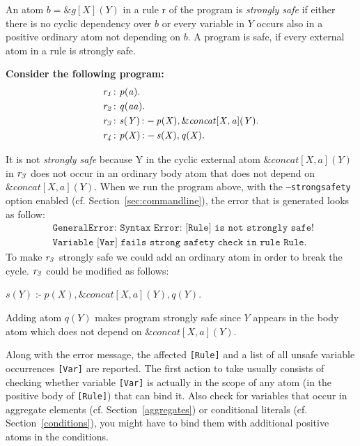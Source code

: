 \documentclass[a4paper, titlepage]{article}
\newcommand{\ext}[3]{\ensuremath{\&{#1}[#2](#3)}}
\DeclareMathOperator{\leftimpl}{:-}
\newcommand{\row}[1]{%
  \ensuremath{\it \color{black} #1 \color{black}}%
}
\begin{document}
An atom $b=\ext{g}{X}{Y}$ in a rule r of the program is \emph{strongly safe} if either there is no cyclic dependency over $b$   or every variable in $Y$ occurs also in a positive ordinary atom not depending on $b$. A program is safe, if every external atom in a rule is strongly safe. 


\begin{exmp} \textbf{Consider the following program:}
\label{strongSafetyExmp}
\begin{align*}
& \row{r_1} \colon p(a). \\
& \row{r_2} \colon q(aa). \\
& \row{r_3} \colon s(Y) \leftimpl p(X), \ext{concat}{X,a}{Y}. \\
& \row{r_4} \colon p(X) \leftimpl s(X), q(X).
\end{align*}
\end{exmp}
It is not \emph{strongly safe} because Y in the cyclic external atom $\ext{concat}{X,a}{Y}$ in $\row{r_3}$ does not occur in an
ordinary body atom that does not depend on 
\\$\ext{concat}{X,a}{Y}$. When we run the program above, with the \texttt{--strongsafety} option enabled (cf. Section~\ref{sec:commandline}), the error that is generated looks as follow:
\begin{align*}
& \texttt{GeneralError: Syntax Error: [Rule] is not strongly safe! }  \\
& \texttt{Variable [Var] fails strong safety check in rule Rule.}
\end{align*}
To make $\row{r_3}$ strongly safe we could add an ordinary atom in order to break the cycle. $\row{r_3}$ could be modified as follows: \\ \centerline{$s(Y) \leftimpl p(X), \ext{concat}{X,a}{Y},q(Y).$} Adding atom $q(Y)$ makes program strongly safe since $Y$ appears in the body atom which does not depend on $\ext{concat}{X,a}{Y}$.
 
Along with the error message, the affected \texttt{[Rule]} and a list of all unsafe variable occurrences \texttt{[Var]} are reported. 
The first action to take usually consists of checking whether variable \texttt{[Var]} is actually in the scope of any atom (in the positive body of \texttt{[Rule]}) that can bind it. Also check for variables that occur in aggregate elements (cf. Section~\ref{aggregates}) or conditional literals (cf. Section~\ref{conditions}), you might have to bind them with additional positive atoms in the conditions. 
\end{document}
